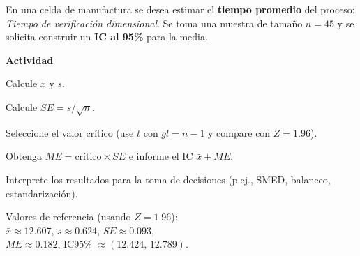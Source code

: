 \begin{ejercicio}[Tiempo de verificación dimensional (n=45)]
En una celda de manufactura se desea estimar el \textbf{tiempo promedio} del proceso: \emph{Tiempo de verificación dimensional}.
Se toma una muestra de tamaño $n=45$ y se solicita construir un \textbf{IC al 95\%} para la media.


\textbf{Actividad}
\begin{pasos}
  \item Calcule $\bar{x}$ y $s$.
  \item Calcule $SE = s/\sqrt{n}$.
  \item Seleccione el valor crítico (use $t$ con $gl=n-1$ y compare con $Z=1.96$).
  \item Obtenga $ME=\text{crítico}\times SE$ e informe el IC $\bar{x}\pm ME$.
  \item Interprete los resultados para la toma de decisiones (p.ej., SMED, balanceo, estandarización).
\end{pasos}

\begin{clave}
\noindent Valores de referencia (usando $Z=1.96$):\\
$\bar{x} \approx 12.607$, \quad $s \approx 0.624$, \quad $SE \approx 0.093$,\\
$ME \approx 0.182$, \quad IC95\% $\approx (12.424,\, 12.789)$.
\end{clave}
\end{ejercicio}


